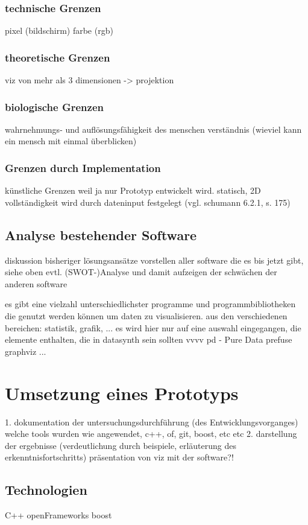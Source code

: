 \documentclass[a4paper, 12pt, DIVcalc, onepage, pdftex, headsepline, footsepline]{scrreprt}
\begin{document}
\subsection{technische Grenzen}
pixel (bildschirm)
farbe (rgb)
\subsection{theoretische Grenzen}
viz von mehr als 3 dimensionen -> projektion
\subsection{biologische Grenzen}
wahrnehmungs- und auflösungsfähigkeit des menschen
verständnis (wieviel kann ein mensch mit einmal überblicken)
\subsection{Grenzen durch Implementation}
künstliche Grenzen weil ja nur Prototyp entwickelt wird.
statisch, 2D vollständigkeit wird durch dateninput festgelegt (vgl. schumann 6.2.1, s. 175)

\section{Analyse bestehender Software}
\label{sec:bestehendeSoftware}
diskussion bisheriger lösungsansätze
vorstellen aller software die es bis jetzt gibt, siehe oben
evtl. (SWOT-)Analyse und damit aufzeigen der schwächen der anderen software

es gibt eine vielzahl unterschiedlichster programme und programmbibliotheken die genutzt werden können um daten zu visualisieren.
aus den verschiedenen bereichen: statistik, grafik, ...
es wird hier nur auf eine auswahl eingegangen, die elemente enthalten, die in datasynth sein sollten
vvvv
pd - Pure Data
prefuse
graphviz
...
\chapter{Umsetzung eines Prototyps}
\label{cha:Umsetzung}
1. dokumentation der untersuchungsdurchführung (des Entwicklungsvorganges)
welche tools wurden wie angewendet, c++, of, git, boost, etc etc
2. darstellung der ergebnisse (verdeutlichung durch beispiele, erläuterung des erkenntnisfortschritts)
präsentation von viz mit der software?!
\section{Technologien}
\label{sec:Technologien}
C++
openFrameworks
boost
\end{document}
